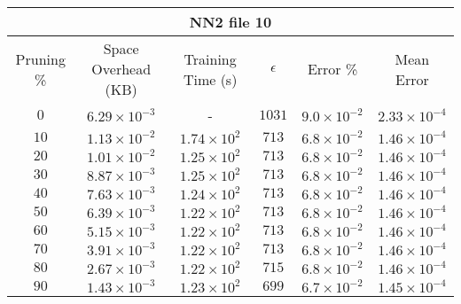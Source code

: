 \begin{adjustwidth}{0cm}{}
\begin{tabular}{cccccc}
\hline
\multicolumn{6}{c}{NN2 file 10} \\
\toprule
Pruning \% & Space Overhead (KB) & Training Time (s) & $\epsilon$ & Error \% & Mean Error\\
\midrule
$0$ & $6.29 \times 10^{-3}$ & - & $1031$ & $9.0 \times 10^{-2}$ & $2.33 \times 10^{-4}$\\
$10$ & $1.13 \times 10^{-2}$ & $1.74 \times 10^{2}$ & $713$ & $6.8 \times 10^{-2}$ & $1.46 \times 10^{-4}$\\
$20$ & $1.01 \times 10^{-2}$ & $1.25 \times 10^{2}$ & $713$ & $6.8 \times 10^{-2}$ & $1.46 \times 10^{-4}$\\
$30$ & $8.87 \times 10^{-3}$ & $1.25 \times 10^{2}$ & $713$ & $6.8 \times 10^{-2}$ & $1.46 \times 10^{-4}$\\
$40$ & $7.63 \times 10^{-3}$ & $1.24 \times 10^{2}$ & $713$ & $6.8 \times 10^{-2}$ & $1.46 \times 10^{-4}$\\
$50$ & $6.39 \times 10^{-3}$ & $1.22 \times 10^{2}$ & $713$ & $6.8 \times 10^{-2}$ & $1.46 \times 10^{-4}$\\
$60$ & $5.15 \times 10^{-3}$ & $1.22 \times 10^{2}$ & $713$ & $6.8 \times 10^{-2}$ & $1.46 \times 10^{-4}$\\
$70$ & $3.91 \times 10^{-3}$ & $1.22 \times 10^{2}$ & $713$ & $6.8 \times 10^{-2}$ & $1.46 \times 10^{-4}$\\
$80$ & $2.67 \times 10^{-3}$ & $1.22 \times 10^{2}$ & $715$ & $6.8 \times 10^{-2}$ & $1.46 \times 10^{-4}$\\
$90$ & $1.43 \times 10^{-3}$ & $1.23 \times 10^{2}$ & $699$ & $6.7 \times 10^{-2}$ & $1.45 \times 10^{-4}$\\
\bottomrule
\end{tabular}
\end{adjustwidth}

\newpage

